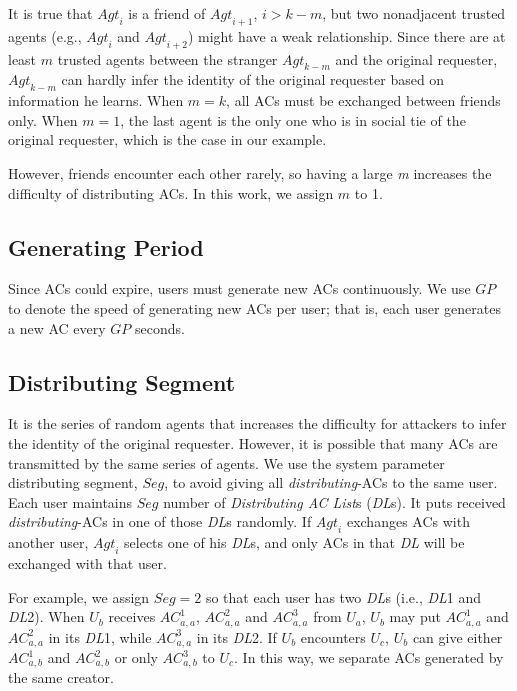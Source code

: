 It is true that ${Agt}_i$ is a friend of ${Agt}_{i+1}$, $i>k-m$, but two nonadjacent trusted agents (e.g., ${Agt}_i$ and ${Agt}_{i+2}$) might have a weak relationship. Since there are at least $m$ trusted agents between the stranger ${Agt}_{k-m}$ and the original requester, ${Agt}_{k-m}$ can hardly infer the identity of the original requester based on information he learns. When $m=k$, all ACs must be exchanged between friends only. When $m=1$, the last agent is the only one who is in social tie of the original requester, which is the case in our example.

However, friends encounter each other rarely, so having a large \textit{m} increases the difficulty of distributing ACs. In this work, we assign $m$ to 1.

\subsection{Generating Period}

\noindent Since ACs could expire, users must generate new ACs continuously. We use $GP$ to denote the speed of generating new ACs per user; that is, each user generates a new AC every $GP$ seconds.



\subsection{Distributing Segment}

\noindent It is the series of random agents that increases the difficulty for attackers to infer the identity of the original requester. However, it is possible that many ACs are transmitted by the same series of agents. We use the system parameter distributing segment, $Seg$, to avoid giving all \textit{distributing}-ACs to the same user. Each user maintains $Seg$ number of \textit{Distributing AC List}s (\textit{DL}s). It puts received \textit{distributing}-ACs in one of those \textit{DL}s randomly. If ${Agt}_i$ exchanges ACs with another user, ${Agt}_i$ selects one of his \textit{DL}s, and only ACs in that \textit{DL} will be exchanged with that user.

For example, we assign $Seg=2$ so that each user has two \textit{DL}s (i.e., \textit{DL}1 and \textit{DL}2). When $U_b$ receives ${AC}^1_{a,a}$, ${AC}^2_{a,a}$ and ${AC}^3_{a,a}$ from $U_a$, $U_b$ may put ${AC}^1_{a,a}$ and ${AC}^2_{a,a}$ in its \textit{DL}1, while ${AC}^3_{a,a}$ in its \textit{DL}2. If $U_b$ encounters $U_c$, $U_b$ can give either ${AC}^1_{a,b}$ and ${AC}^2_{a,b}$ or only ${AC}^3_{a,b}$ to $U_c$. In this way, we separate ACs generated by the same creator.

